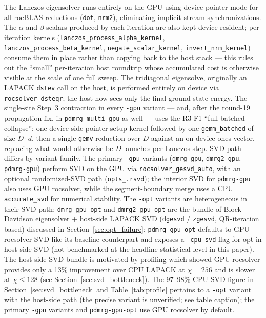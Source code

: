 \documentclass[preprint,12pt]{elsarticle}
\begin{document}
The Lanczos eigensolver runs entirely on the GPU using device-pointer mode for all rocBLAS reductions (\texttt{dot}, \texttt{nrm2}), eliminating implicit stream synchronizations.
The $\alpha$ and $\beta$ scalars produced by each iteration are also kept device-resident; per-iteration kernels (\texttt{lanczos\_process\_alpha\_kernel}, \texttt{lanczos\_process\_beta\_kernel}, \texttt{negate\_scalar\_kernel}, \texttt{invert\_nrm\_kernel}) consume them in place rather than copying back to the host stack — this rules out the ``small'' per-iteration host roundtrip whose accumulated cost is otherwise visible at the scale of one full sweep.
The tridiagonal eigensolve, originally an LAPACK \texttt{dstev} call on the host, is performed entirely on device via \texttt{rocsolver\_dsteqr}; the host now sees only the final ground-state energy.
The single-site Step~3 contraction in every \texttt{-gpu} variant — and, after the round-19 propagation fix, in \texttt{pdmrg-multi-gpu} as well — uses the R3-F1 ``full-batched collapse'': one device-side pointer-setup kernel followed by one \texttt{gemm\_batched} of size $D \cdot d$, then a single \texttt{gemv} reduction over $D$ against an on-device ones-vector, replacing what would otherwise be $D$ launches per Lanczos step.
SVD path differs by variant family.
The primary \texttt{-gpu} variants (\texttt{dmrg-gpu}, \texttt{dmrg2-gpu}, \texttt{pdmrg-gpu}) perform SVD on the GPU via \texttt{rocsolver\_gesvd\_auto}, with an optional randomized-SVD path (\texttt{opts\_.rsvd}); the interior SVD for \texttt{pdmrg-gpu} also uses GPU rocsolver, while the segment-boundary merge uses a CPU \texttt{accurate\_svd} for numerical stability.
The \texttt{-opt} variants are heterogeneous in their SVD path: \texttt{dmrg-gpu-opt} and \texttt{dmrg2-gpu-opt} are the bundle of Block-Davidson eigensolver + host-side LAPACK SVD (\texttt{dgesvd} / \texttt{zgesvd}, QR-iteration based) discussed in Section~\ref{sec:opt_failure}; \texttt{pdmrg-gpu-opt} defaults to GPU rocsolver SVD like its baseline counterpart and exposes a \texttt{--cpu-svd} flag for opt-in host-side SVD (not benchmarked at the headline statistical level in this paper).
The host-side SVD bundle is motivated by profiling which showed GPU rocsolver provides only a 13\% improvement over CPU LAPACK at $\chi = 256$ and is slower at $\chi \leq 128$ (see Section~\ref{sec:svd_bottleneck}).
The 97--98\% CPU-SVD figure in Section~\ref{sec:svd_bottleneck} and Table~\ref{tab:profile} pertains to a \texttt{-opt} variant with the host-side path (the precise variant is unverified; see table caption); the primary \texttt{-gpu} variants and \texttt{pdmrg-gpu-opt} use GPU rocsolver by default.
\end{document}

